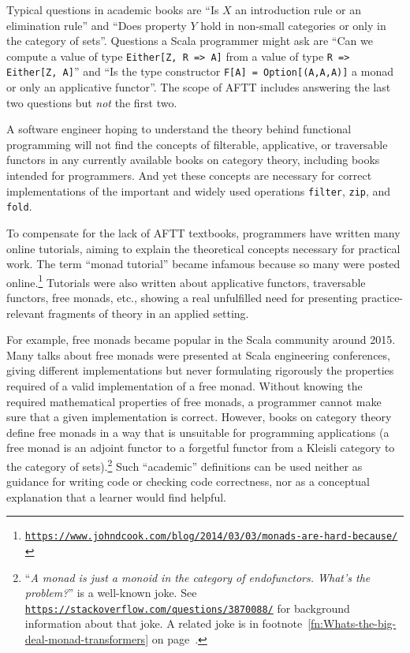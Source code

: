 Typical questions in academic books are \textsf{``}Is $X$ an introduction
rule or an elimination rule\textsf{''} and \textsf{``}Does property $Y$ hold in non-small
categories or only in the category of sets\textsf{''}. Questions a Scala programmer
might ask are \textsf{``}Can we compute a value of type \lstinline!Either[Z, R => A]!
from a value of type \lstinline!R => Either[Z, A]!\textsf{''} and \textsf{``}Is the
type constructor \lstinline!F[A] = Option[(A,A,A)]! a monad or only
an applicative functor\textsf{''}. The scope of AFTT includes answering the
last two questions but \emph{not} the first two.

A software engineer hoping to understand the theory behind functional
programming will not find the concepts of filterable, applicative,
or traversable functors in any currently available books on category
theory, including books intended for programmers. And yet these concepts
are necessary for correct implementations of the important and widely
used operations \lstinline!filter!, \lstinline!zip!, and \lstinline!fold!.

To compensate for the lack of AFTT textbooks, programmers have written
many online tutorials, aiming to explain the theoretical concepts
necessary for practical work. The term \textsf{``}monad tutorial\textsf{''} became
infamous because so many were  posted online.\footnote{\texttt{\href{https://www.johndcook.com/blog/2014/03/03/monads-are-hard-because/}{https://www.johndcook.com/blog/2014/03/03/monads-are-hard-because/}}}
Tutorials were also written about applicative functors, traversable
functors, free monads, etc., showing a real unfulfilled need for presenting
practice-relevant fragments of theory in an applied setting. 

For example, free monads became popular in the Scala community around
2015. Many talks about free monads were presented at Scala engineering
conferences, giving different implementations but never formulating
rigorously the properties required of a valid implementation of a
free monad. Without knowing the required mathematical properties of
free monads, a programmer cannot make sure that a given implementation
is correct. However, books on category theory define free monads in
a way that is unsuitable for programming applications (a free monad
is an adjoint functor to a forgetful functor from a Kleisli category
to the category of sets).\footnote{\textsf{``}\emph{A monad is just a monoid in the category of endofunctors.
What\textsf{'}s the problem?}\textsf{''} is a well-known joke.\label{fn:A-monad-is-a-monoid-in-category-of-endofunctors-big-deal}
See \texttt{\href{https://stackoverflow.com/questions/3870088/}{https://stackoverflow.com/questions/3870088/}}
for background information about that joke. A related joke is in footnote~\ref{fn:Whats-the-big-deal-monad-transformers}
on page~\pageref{fn:Whats-the-big-deal-monad-transformers}.} Such \textsf{``}academic\textsf{''} definitions can be used neither as guidance for
writing code or checking code correctness, nor as a conceptual explanation
that a learner would find helpful.

